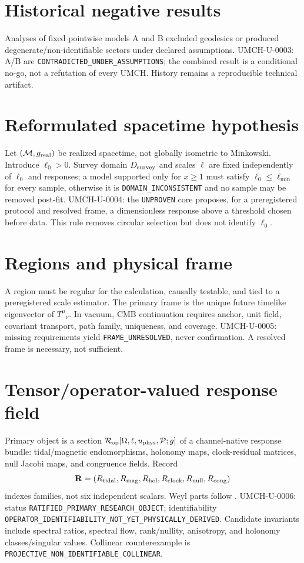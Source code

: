 \documentclass[11pt,a4paper]{article}
\begin{document}
\section{Historical negative results}\label{sec:u-negative-history}
Analyses of fixed pointwise models A and B excluded geodesics or produced degenerate/non-identifiable sectors under declared assumptions. UMCH-U-0003: A/B are \verb|CONTRADICTED_UNDER_ASSUMPTIONS|; the combined result is a conditional no-go, not a refutation of every UMCH. History remains a reproducible technical artifact.

\section{Reformulated spacetime hypothesis}\label{sec:u-hypothesis}
Let $(\mathcal M,g_{\rm real})$ be realized spacetime, not globally isometric to Minkowski. Introduce $\ell_0>0$. Survey domain $D_{\rm survey}$ and scales $\ell$ are fixed independently of $\ell_0$ and responses; a model supported only for $x\geq1$ must satisfy $\ell_0\leq\ell_{\min}$ for every sample, otherwise it is \verb|DOMAIN_INCONSISTENT| and no sample may be removed post-fit. UMCH-U-0004: the \verb|UNPROVEN| core proposes, for a preregistered protocol and resolved frame, a dimensionless response above a threshold chosen before data. This rule removes circular selection but does not identify $\ell_0$.

\section{Regions and physical frame}\label{sec:u-frame}
A region must be regular for the calculation, causally testable, and tied to a preregistered scale estimator. The primary frame is the unique future timelike eigenvector of $T^\mu{}_{\nu}$. In vacuum, CMB continuation requires anchor, unit field, covariant transport, path family, uniqueness, and coverage. UMCH-U-0005: missing requirements yield \verb|FRAME_UNRESOLVED|, never confirmation. A resolved frame is necessary, not sufficient.

\section{Tensor/operator-valued response field}\label{sec:u-response}
Primary object is a section $\mathcal R_{\rm op}[\Omega,\ell,u_{\rm phys},\mathcal P;g]$ of a channel-native response bundle: tidal/magnetic endomorphisms, holonomy maps, clock-residual matrices, null Jacobi maps, and congruence fields. Record
\begin{equation}\label{eq:u-vector}\mathbf R=(R_{\rm tidal},R_{\rm mag},R_{\rm hol},R_{\rm clock},R_{\rm null},R_{\rm cong})\end{equation}
indexes families, not six independent scalars. Weyl parts follow \cite{Bonnor1995,MaartensBassett1998}. UMCH-U-0006: status \verb|RATIFIED_PRIMARY_RESEARCH_OBJECT|; identifiability \verb|OPERATOR_IDENTIFIABILITY_NOT_YET_PHYSICALLY_DERIVED|. Candidate invariants include spectral ratios, spectral flow, rank/nullity, anisotropy, and holonomy classes/singular values. Collinear counterexample is \verb|PROJECTIVE_NON_IDENTIFIABLE_COLLINEAR|.
\end{document}
